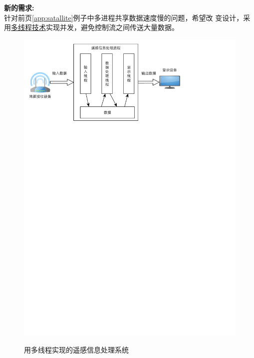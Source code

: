 \documentclass[compress]{beamer}
\begin{document}
\begin{frame}
   {
    \textbf{新的需求:} \\[2ex]
    针对前页\ref{app:satallite}例子中多进程共享数据速度慢的问题，希望改
    变设计，采用\uline{多线程技术}实现并发，避免控制流之间传送大量数据。
  }
   {
  \centering\begin{figure}
  \includegraphics[width=0.9\hsize]{yaogan-threads.pdf}

  用多线程实现的遥感信息处理系统
  \end{figure}
  }


\end{frame}
\end{document}
